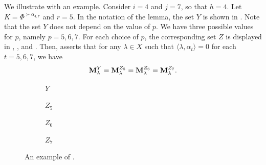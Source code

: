 \begin{example}\rm

  We illustrate  with an example. 
  Consider $ i = 4 $ and $ j = 7 $, so that $ h = 4 $. 
  Let $ K = \Phi^{\succ \alpha_{4,7}} $ and $ r = 5 $.
  In the notation of the lemma, the set $ Y $ is shown in . 
  Note that the set $ Y $ does not depend on the value of $ p $. 
  We have three possible values for $ p $, namely $ p = 5, 6, 7 $. 
  For each choice of $ p $, the corresponding set $ Z $ is displayed in , , and . 
  Then,  asserts that for any $ \lambda \in X $ such that $ \langle \lambda, \alpha_t \rangle = 0 $ for each $ t = 5, 6, 7 $, we have
    \begin{equation}
        \mathbf{M}_\lambda^Y = \mathbf{M}_\lambda^{Z_5} =  \mathbf{M}_\lambda^{Z_6}  =  \mathbf{M}_\lambda^{Z_7} .
    \end{equation}

\begin{figure}[H]
     \centering
     \begin{subfigure}[b]{0.22\textwidth}
         \centering
        {\scalebox{.3}{\exLemmaBKA }}
    \caption{ $Y$  }
    \label{fig: ExaLemma3.15A}
     \end{subfigure}
     \hfill
     \begin{subfigure}[b]{0.22\textwidth}
         \centering
        {\scalebox{.3}{\exLemmaBKB}}
    \caption{$Z_5 $}
    \label{fig: ExaLemma3.15B}
     \end{subfigure}
          \hfill
     \begin{subfigure}[b]{0.22\textwidth}
         \centering
        {\scalebox{.3}{\exLemmaBKC}}
    \caption{ $Z_6 $}
    \label{fig: ExaLemma3.15C}
     \end{subfigure}
               \hfill
     \begin{subfigure}[b]{0.22\textwidth}
         \centering
        {\scalebox{.3}{\exLemmaBKD}}
    \caption{$ Z_7$}
    \label{fig: ExaLemma3.15D}
     \end{subfigure}
        \caption{An example of .}
        \label{fig: EJEMPLO Lemma 3.15}
\end{figure}
\end{example}





